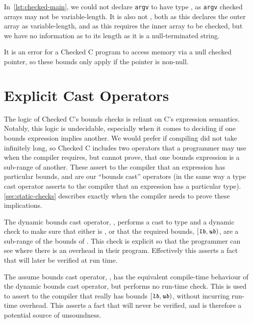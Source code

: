 In~\autoref{lst:checked-main}, we could not declare \lstinline|argv|
to have type , as
\lstinline|argv| checked arrays may not be variable-length. It is also
not , both as this
declares the outer array as variable-length, and as this requires the
inner array to be checked, but we have no information as to its length
as it is a null-terminated string.

It is an error for a Checked C program to access memory via a null
checked pointer, so these bounds only apply if the pointer is
non-null.

\section{Explicit Cast Operators}
\label{sec:dynamiccastops}

The logic of Checked C's bounds checks is reliant on C's expression
semantics. Notably, this logic is undecidable, especially when it
comes to deciding if one bounds expression implies another. We would
prefer if compiling did not take infinitely long, so Checked C includes
two operators that a programmer may use when the compiler requires,
but cannot prove, that one bounds expression is a sub-range of
another. These assert to the compiler that an expression has
particular bounds, and are our ``bounds cast'' operators (in the same
way a type cast operator asserts to the compiler that an expression
has a particular type). \autoref{sec:static-checks} describes exactly
when the compiler needs to prove these implications.

The dynamic bounds cast operator,
, performs a cast to
type  and a dynamic check to make sure that either  is
\NULL, or that the required bounds, $\left[\mv{lb}, \mv{ub}\right)$,
are a sub-range of the bounds of . This check is explicit so that
the programmer can see where there is an overhead in their program.
Effectively this asserts a fact that will later be verified at run time.

The assume bounds cast operator,
, has the equivalent
compile-time behaviour of the dynamic bounds cast operator, but
performs no run-time check. This is used to assert to the compiler
that  really has bounds $[\mv{lb}, \mv{ub})$, without incurring
run-time overhead. This asserts a fact that will never be verified,
and is therefore a potential source of unsoundness.

